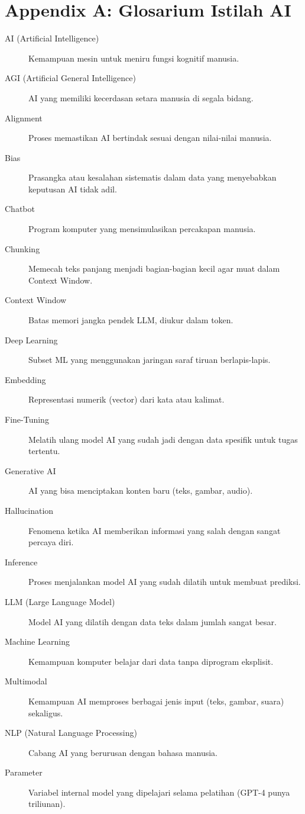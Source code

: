 \chapter{Appendix A: Glosarium Istilah AI}
\label{chap:appendix_a}

\begin{description}
    \item[AI (Artificial Intelligence)] Kemampuan mesin untuk meniru fungsi kognitif manusia.
    \item[AGI (Artificial General Intelligence)] AI yang memiliki kecerdasan setara manusia di segala bidang.
    \item[Alignment] Proses memastikan AI bertindak sesuai dengan nilai-nilai manusia.
    \item[Bias] Prasangka atau kesalahan sistematis dalam data yang menyebabkan keputusan AI tidak adil.
    \item[Chatbot] Program komputer yang mensimulasikan percakapan manusia.
    \item[Chunking] Memecah teks panjang menjadi bagian-bagian kecil agar muat dalam Context Window.
    \item[Context Window] Batas memori jangka pendek LLM, diukur dalam token.
    \item[Deep Learning] Subset ML yang menggunakan jaringan saraf tiruan berlapis-lapis.
    \item[Embedding] Representasi numerik (vector) dari kata atau kalimat.
    \item[Fine-Tuning] Melatih ulang model AI yang sudah jadi dengan data spesifik untuk tugas tertentu.
    \item[Generative AI] AI yang bisa menciptakan konten baru (teks, gambar, audio).
    \item[Hallucination] Fenomena ketika AI memberikan informasi yang salah dengan sangat percaya diri.
    \item[Inference] Proses menjalankan model AI yang sudah dilatih untuk membuat prediksi.
    \item[LLM (Large Language Model)] Model AI yang dilatih dengan data teks dalam jumlah sangat besar.
    \item[Machine Learning] Kemampuan komputer belajar dari data tanpa diprogram eksplisit.
    \item[Multimodal] Kemampuan AI memproses berbagai jenis input (teks, gambar, suara) sekaligus.
    \item[NLP (Natural Language Processing)] Cabang AI yang berurusan dengan bahasa manusia.
    \item[Parameter] Variabel internal model yang dipelajari selama pelatihan (GPT-4 punya triliunan).

\end{description}
